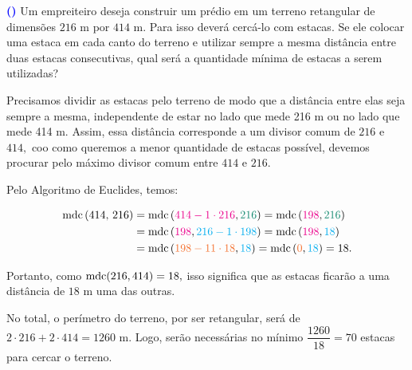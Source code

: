 \documentclass[12pt, a4paper]{article}
\newcommand{\mdc}{{\rm mdc}}
\newcounter{exercicio}[section]
\newenvironment{exercicio}[1][]{\refstepcounter{exercicio}\par\medskip
 \textcolor{blue}{\bf(\theexercicio)} \rmfamily}{\medskip }
\begin{document}
\begin{exercicio}
Um empreiteiro deseja construir um prédio em um terreno retangular de dimensões $216$ m por $414$ m. Para isso deverá cercá-lo com estacas. Se ele colocar uma estaca em cada canto do terreno e utilizar sempre a mesma distância entre duas estacas consecutivas, qual será a quantidade mínima de estacas a serem utilizadas?
\end{exercicio}
\begin{solution}
Precisamos dividir as estacas pelo terreno de modo que a distância entre elas seja sempre a mesma, independente de estar no lado que mede 216 m ou no lado que mede 414 m. Assim, essa distância corresponde a um divisor comum de $216$ e $414,$ coo como queremos a menor quantidade de estacas possível, devemos procurar pelo máximo divisor comum entre $414$ e $216.$ 

Pelo Algoritmo de Euclides, temos:


   \begin{align*}
    \mdc \left( \text{414, 216} \right)&=\mdc \left( \textcolor{Magenta}{414-1\cdot216}, \textcolor{PineGreen}{216} \right) =\mdc \left( \textcolor{Magenta}{198}, \textcolor{PineGreen}{216} \right)\\& =\mdc \left( \textcolor{Magenta}{198}, \textcolor{Cyan}{216-1\cdot198} \right) =
    \mdc \left( \textcolor{Magenta}{198}, \textcolor{Cyan}{18} \right)\\&=\mdc \left( \textcolor{Orange}{198-11\cdot18}, \textcolor{Cyan}{18} \right) =\mdc \left( \textcolor{Orange}{0}, \textcolor{Cyan}{18} \right) = 18.
    \end{align*}
    
Portanto, como $\mdc(216, 414) = 18,$ isso significa que as estacas ficarão a uma distância de $18$ m uma das outras. 

No total, o perímetro do terreno, por ser retangular, será de $2 \cdot 216 + 2 \cdot 414 = 1260$ m. Logo, serão necessárias no mínimo $\dfrac{1260}{18} = 70$ estacas para cercar o terreno.

\end{solution}
\end{document}
